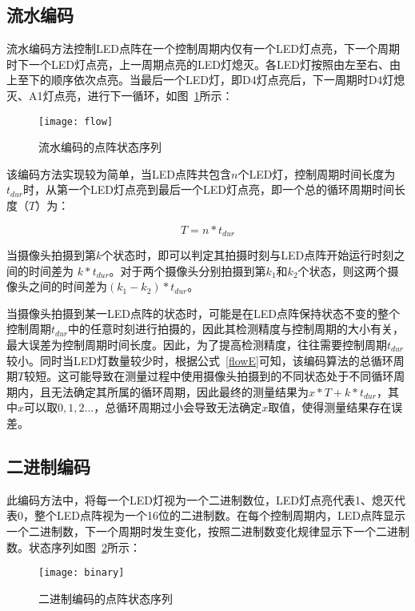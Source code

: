 \subsection{流水编码}
\label{flow1}

流水编码方法控制LED点阵在一个控制周期内仅有一个LED灯点亮，下一个周期时下一个LED灯点亮，上一周期点亮的LED灯熄灭。各LED灯按照由左至右、由上至下的顺序依次点亮。当最后一个LED灯，即D4灯点亮后，下一周期时D4灯熄灭、A1灯点亮，进行下一循环，如图~\ref{flow}所示：

\begin{figure}[h] 
  \centering
  \texttt{[image: flow]}
  \caption{流水编码的点阵状态序列}
  \label{flow}
\end{figure}

该编码方法实现较为简单，当LED点阵共包含$n$个LED灯，控制周期时间长度为$t_{dur}$时，从第一个LED灯点亮到最后一个LED灯点亮，即一个总的循环周期时间长度（$T$）为：

\begin{equation}
T = n * t_{dur}
  \label{flowE}
\end{equation}

当摄像头拍摄到第$k$个状态时，即可以判定其拍摄时刻与LED点阵开始运行时刻之间的时间差为 $k * t_{dur}$。对于两个摄像头分别拍摄到第$k_1$和$k_2$个状态，则这两个摄像头之间的时间差为$(k_1 - k_2) * t_{dur}$。

当摄像头拍摄到某一LED点阵的状态时，可能是在LED点阵保持状态不变的整个控制周期$t_{dur}$中的任意时刻进行拍摄的，因此其检测精度与控制周期的大小有关，最大误差为控制周期时间长度。因此，为了提高检测精度，往往需要控制周期$t_{dur}$较小。同时当LED灯数量较少时，根据公式~\ref{flowE}可知，该编码算法的总循环周期$T$较短。这可能导致在测量过程中使用摄像头拍摄到的不同状态处于不同循环周期内，且无法确定其所属的循环周期，因此最终的测量结果为$x * T + k * t_{dur}$，其中$x$可以取$0, 1, 2...$，总循环周期过小会导致无法确定$x$取值，使得测量结果存在误差。

\subsection{二进制编码}

此编码方法中，将每一个LED灯视为一个二进制数位，LED灯点亮代表1、熄灭代表0，整个LED点阵视为一个16位的二进制数。在每个控制周期内，LED点阵显示一个二进制数，下一个周期时发生变化，按照二进制数变化规律显示下一个二进制数。状态序列如图~\ref{binary}所示：

\begin{figure}[h] 
  \centering
  \texttt{[image: binary]}
  \caption{二进制编码的点阵状态序列}
  \label{binary}
\end{figure}

